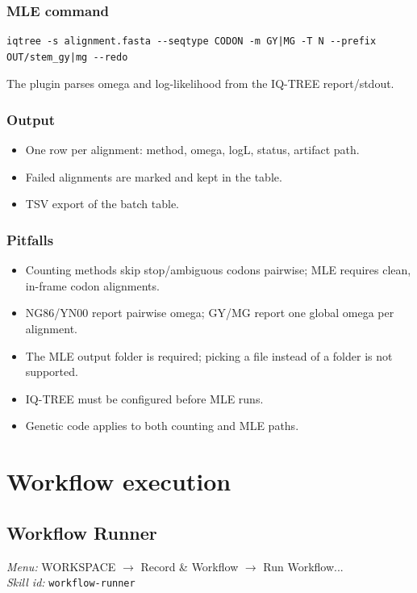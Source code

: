 \documentclass[11pt]{report}
\begin{document}
\subsection{MLE command}

\begin{lstlisting}
iqtree -s alignment.fasta --seqtype CODON -m GY|MG -T N --prefix OUT/stem_gy|mg --redo
\end{lstlisting}

The plugin parses omega and log-likelihood from the IQ-TREE report/stdout.

\subsection{Output}

\begin{itemize}
  \item One row per alignment: method, omega, logL, status, artifact path.
  \item Failed alignments are marked and kept in the table.
  \item TSV export of the batch table.
\end{itemize}

\subsection{Pitfalls}

\begin{itemize}
  \item Counting methods skip stop/ambiguous codons pairwise; MLE requires clean, in-frame codon alignments.
  \item NG86/YN00 report pairwise omega; GY/MG report one global omega per alignment.
  \item The MLE output folder is required; picking a file instead of a folder is not supported.
  \item IQ-TREE must be configured before MLE runs.
  \item Genetic code applies to both counting and MLE paths.
\end{itemize}


\chapter{Workflow execution}
\section{Workflow Runner}
\noindent\textit{Menu:} WORKSPACE $\rightarrow$ Record \& Workflow $\rightarrow$ Run Workflow...\\
\noindent\textit{Skill id:} \texttt{workflow-runner}
\end{document}
